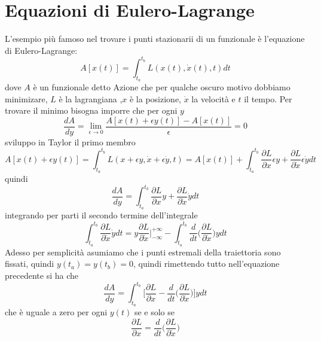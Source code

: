 \documentclass[11pt,a4paper]{article}
\theoremstyle{definition}
\theoremstyle{plain}
\theoremstyle{plain}
\begin{document}
	\section{Equazioni di Eulero-Lagrange}
		L'esempio più famoso nel trovare i punti stazionarii di un funzionale è l'equazione di Eulero-Lagrange:
		\begin{equation}
			A[x(t)]=\int_{t_a}^{t_b}L(x(t),\dot{x}(t),t)dt
		\end{equation}
		dove $A$ è un funzionale detto Azione che per qualche oscuro motivo dobbiamo minimizare, $L$ è la lagrangiana ,$x$ è la posizione, $\dot{x}$ la velocità e $t$ il tempo.
		Per trovare il minimo bisogna imporre che per ogni $y$
		\[
			\frac{dA}{dy}=\lim_{\epsilon \to 0}\frac{A[x(t)+\epsilon y(t)]-A[x(t)]}{\epsilon}=0
		\]
		sviluppo in Taylor il primo membro
		\[
			A[x(t)+\epsilon y(t)]=\int_{t_a}^{t_b}L(x+\epsilon y,\dot{x}+\epsilon \dot{y},t)=A[x(t)]+\int_{t_a}^{t_b}\frac{\partial{L}}{\partial{x}}\epsilon y+\frac{\partial{L}}{\partial{\dot{x}}}\epsilon \dot{y}dt
		\]
		quindi
		\[
			\frac{dA}{dy}=\int_{t_a}^{t_b}\frac{\partial{L}}{\partial{x}}y+\frac{\partial{L}}{\partial{\dot{x}}}\dot{y}dt
		\]
		integrando per parti il secondo termine dell'integrale
		\[
			\int_{t_a}^{t_b}\frac{\partial{L}}{\partial{\dot{x}}}\dot{y}dt=y\frac{\partial{L}}{\partial{\dot{x}}}\bigg\rvert_{-\infty}^{+\infty}-
			\int_{t_a}^{t_b}\frac{d}{dt}\bigg(\frac{\partial{L}}{\partial{\dot{x}}} \bigg)ydt
		\]
		Adesso per semplicità asumiamo che i punti estremali della traiettoria sono fissati, quindi $y(t_a)=y(t_b)=0$, quindi rimettendo tutto nell'equazione precedente si ha che
		\begin{equation}
			\frac{dA}{dy}=\int_{t_a}^{t_b}\bigg[\frac{\partial{L}}{\partial{x}}-\frac{d}{dt}\bigg(\frac{\partial{L}}{\partial{\dot{x}}} \bigg)\bigg]ydt
		\end{equation}
		che è uguale a zero per ogni $y(t)$ se e solo se 
		\begin{equation}
			\frac{\partial{L}}{\partial{x}}=\frac{d}{dt}\bigg(\frac{\partial{L}}{\partial{\dot{x}}} \bigg)
		\end{equation}
\end{document}
